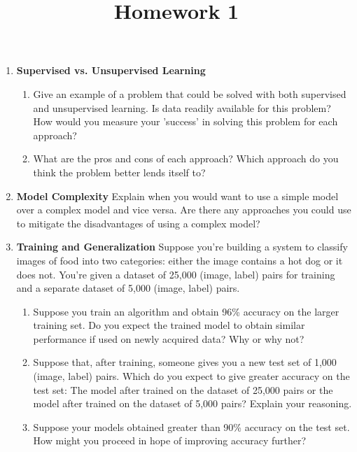 \documentclass{article}
\begin{document}
\title{Homework 1}
\maketitle
\thispagestyle{fancy}

\begin{enumerate}[1)]
	\item \textbf{Supervised vs. Unsupervised Learning}
		\begin{enumerate}[1.]
			\item Give an example of a problem that could be solved with both supervised and unsupervised learning. Is data readily available for this problem? How would you measure your 'success' in solving this problem for each approach?

			\item What are the pros and cons of each approach? Which approach do you think the problem better lends itself to?
				
		\end{enumerate}

	\item \textbf{Model Complexity} Explain when you would want to use a simple model over a complex model and vice versa. Are there any approaches you could use to mitigate the disadvantages of using a complex model?

	\item \textbf{Training and Generalization} Suppose you're building a system to classify images of food into two categories: either the image contains a hot dog or it does not. You're given a dataset of 25,000 (image, label) pairs for training and a separate dataset of 5,000 (image, label) pairs.
		\begin{enumerate}[1.]
			\item Suppose you train an algorithm and obtain 96\% accuracy on the larger training set. Do you expect the trained model to obtain similar performance if used on newly acquired data? Why or why not?

			\item Suppose that, after training, someone gives you a new test set of 1,000 (image, label) pairs. Which do you expect to give greater accuracy on the test set: The model after trained on the dataset of 25,000 pairs or the model after trained on the dataset of 5,000 pairs? Explain your reasoning.

			\item Suppose your models obtained greater than 90\% accuracy on the test set. How might you proceed in hope of improving accuracy further?


\end{enumerate}
\end{enumerate}
\end{document}
